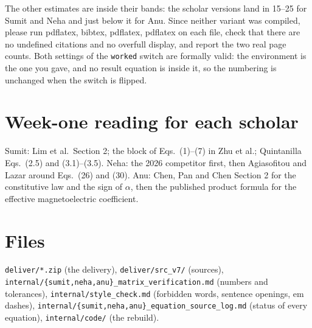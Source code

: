 \documentclass[11pt,a4paper]{article}
\begin{document}
The other estimates are inside their bands: the scholar versions land in 15--25 for Sumit and Neha and just
below it for Anu. Since neither variant was compiled, please run pdflatex, bibtex, pdflatex, pdflatex on each
file, check that there are no undefined citations and no overfull display, and report the two real page
counts. Both settings of the \texttt{worked} switch are formally valid: the environment is the one you gave,
and no result equation is inside it, so the numbering is unchanged when the switch is flipped.

\section*{Week-one reading for each scholar}

Sumit: Lim et al.\ Section 2; the block of Eqs.~(1)--(7) in Zhu et al.; Quintanilla Eqs.~(2.5) and
(3.1)--(3.5). Neha: the 2026 competitor first, then Agiasofitou and Lazar around Eqs.~(26) and (30). Anu:
Chen, Pan and Chen Section 2 for the constitutive law and the sign of $\alpha$, then the published product
formula for the effective magnetoelectric coefficient.

\section*{Files}

\texttt{deliver/*.zip} (the delivery), \texttt{deliver/src\_v7/} (sources),
\texttt{internal/\{sumit,neha,anu\}\_matrix\_verification.md} (numbers and tolerances),
\texttt{internal/style\_check.md} (forbidden words, sentence openings, em dashes),
\texttt{internal/\{sumit,neha,anu\}\_equation\_source\_log.md} (status of every equation),
\texttt{internal/code/} (the rebuild).
\end{document}
